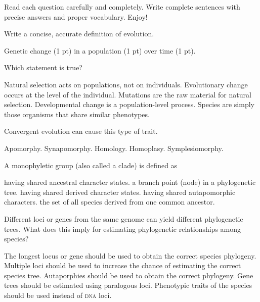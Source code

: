 \documentclass[12pt, addpoints]{exam}
\newcommand*\AnswerBox[2]{%
    \parbox[t][#1]{0.92\textwidth}{%
    \begin{solution}#2\end{solution}}
    \vspace{\stretch{1}}
}
\begin{document}
\noindent Read each question carefully and completely. Write complete sentences with precise answers and proper vocabulary. Enjoy!

\begin{questions}

\question[4]
Write a concise, accurate definition of evolution.

\AnswerBox{0.1\textheight}{%
Genetic change (1 pt) in a population (1 pt) over time (1 pt).
}

\question[2]
Which statement is true?
\begin{choices}
\choice Natural selection acts on populations, not on individuals.
\choice Evolutionary change occurs at the level of the individual.
\correctchoice Mutations are the raw material for natural selection.
\choice Developmental change is a population-level process.
\choice Species are simply those organisms that share similar phenotypes.
\end{choices}

\question[2]
Convergent evolution can cause this type of trait.

\begin{choices}
\choice Apomorphy.
\choice Synapomorphy.
\choice Homology.
\correctchoice Homoplasy.
\choice Symplesiomorphy.
\end{choices}

\question[2]
A monophyletic group (also called a clade) is defined as

\begin{choices}
\choice having shared ancestral character states.
\choice a branch point (node) in a phylogenetic tree.
\choice having shared derived character states.
\choice having shared autapomorphic characters.
\correctchoice the set of all species derived from one common ancestor.
\end{choices}


\question[2]
Different loci or genes from the same genome can yield different phylogenetic trees. What does this imply for estimating phylogenetic relationships among species?

\begin{choices}
\choice The longest locus or gene should be used to obtain the correct species phylogeny.
\correctchoice Multiple loci should be used to increase the chance of estimating the correct species tree.
\choice Autaporphies should be used to obtain the correct phylogeny.
\choice Gene trees should be estimated using paralogous loci.
\choice Phenotypic traits of the species should be used instead of \textsc{dna} loci.
\end{choices}


\end{questions}
\end{document}
